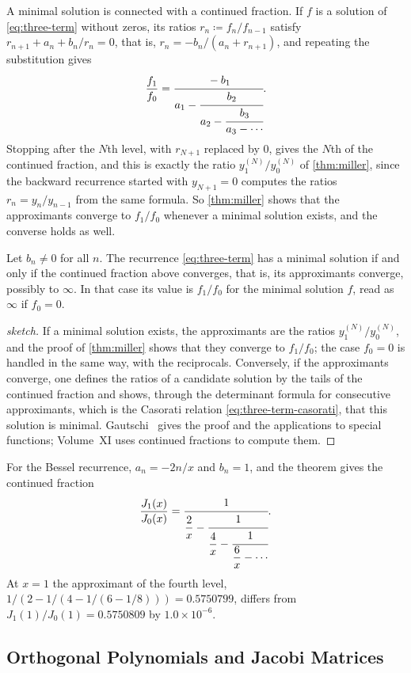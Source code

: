 A minimal solution is connected with a continued fraction. If $f$ is a solution of \eqref{eq:three-term} without zeros, its ratios $r_n\coloneqq f_n/f_{n-1}$ satisfy $r_{n+1}+a_n+b_n/r_n=0$, that is, $r_n=-b_n/(a_n+r_{n+1})$, and repeating the substitution gives
\[
\frac{f_1}{f_0}=\cfrac{-b_1}{a_1-\cfrac{b_2}{a_2-\cfrac{b_3}{a_3-\cdots}}} .
\]
Stopping after the $N$th level, with $r_{N+1}$ replaced by $0$, gives the $N$th  of the continued fraction, and this is exactly the ratio $y^{(N)}_1/y^{(N)}_0$ of \cref{thm:miller}, since the backward recurrence started with $y_{N+1}=0$ computes the ratios $r_n=y_n/y_{n-1}$ from the same formula. So \cref{thm:miller} shows that the approximants converge to $f_1/f_0$ whenever a minimal solution exists, and the converse holds as well.

\begin{theorem}[Pincherle]
\label{thm:pincherle}
Let $b_n\ne0$ for all $n$. The recurrence \eqref{eq:three-term} has a minimal solution if and only if the continued fraction above converges, that is, its approximants converge, possibly to $\infty$. In that case its value is $f_1/f_0$ for the minimal solution $f$, read as $\infty$ if $f_0=0$.
\end{theorem}

\begin{proof}[sketch]
If a minimal solution exists, the approximants are the ratios $y^{(N)}_1/y^{(N)}_0$, and the proof of \cref{thm:miller} shows that they converge to $f_1/f_0$; the case $f_0=0$ is handled in the same way, with the reciprocals. Conversely, if the approximants converge, one defines the ratios of a candidate solution by the tails of the continued fraction and shows, through the determinant formula for consecutive approximants, which is the Casorati relation \eqref{eq:three-term-casorati}, that this solution is minimal. Gautschi~\cite{gautschi1967} gives the proof and the applications to special functions; Volume~XI uses continued fractions to compute them.
\end{proof}

For the Bessel recurrence, $a_n=-2n/x$ and $b_n=1$, and the theorem gives the continued fraction
\[
\frac{J_1(x)}{J_0(x)}=\cfrac1{\dfrac2x-\cfrac1{\dfrac4x-\cfrac1{\dfrac6x-\cdots}}} .
\]
At $x=1$ the approximant of the fourth level, $1/(2-1/(4-1/(6-1/8)))=0.5750799$, differs from $J_1(1)/J_0(1)=0.5750809$ by $1.0\times10^{-6}$.

\subsection{Orthogonal Polynomials and Jacobi Matrices}

